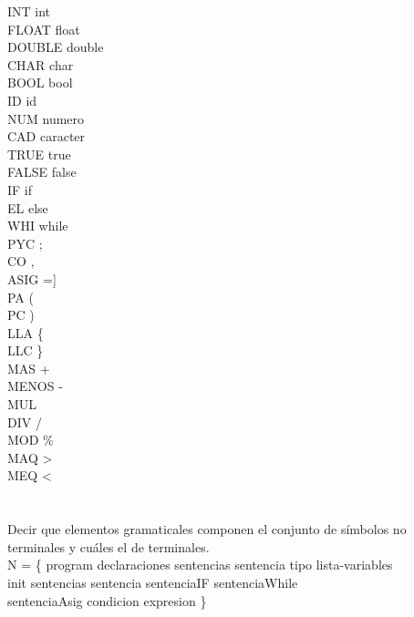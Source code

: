 \documentclass[a4paper,10pt]{article}
\begin{document}
\noindent
    INT \rightarrow int\\
    FLOAT \rightarrow float\\
    DOUBLE \rightarrow double\\
    CHAR \rightarrow char\\
    BOOL \rightarrow bool\\
    ID \rightarrow id\\
    NUM \rightarrow numero\\
    CAD \rightarrow caracter\\
    TRUE \rightarrow true\\
    FALSE \rightarrow false\\
    IF \rightarrow if\\
    EL \rightarrow else\\
    WHI \rightarrow while\\
    PYC \rightarrow ;\\
    CO \rightarrow ,\\
    ASIG \rightarrow =]\\
    PA \rightarrow (\\
    PC \rightarrow )\\
    LLA \rightarrow \{\\
    LLC \rightarrow \}\\
    MAS \rightarrow +\\
    MENOS \rightarrow - \\
    MUL \rightarrow *\\
    DIV \rightarrow /\\
    MOD \rightarrow \%\\
    MAQ \rightarrow >\\
    MEQ \rightarrow <\\
\section{}
Decir que elementos gramaticales componen el conjunto de símbolos no  terminales
y cuáles el de terminales.\\

\noindent
N = \{ program declaraciones sentencias sentencia tipo lista-variables\\
\-\hspace{1cm}init sentencias sentencia sentenciaIF sentenciaWhile\\
\-\hspace{1cm}sentenciaAsig condicion expresion \}\\
\end{document}

